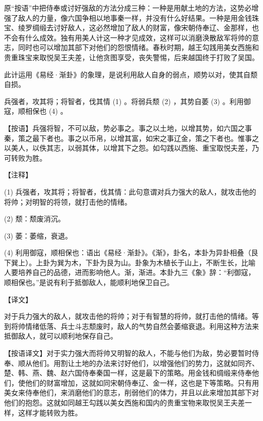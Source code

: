 \documentclass[12pt,UTF8]{ctexbook}
\begin{document}
原“按语”中把侍奉或讨好强敌的方法分成三种：一种是用献土地的方法，这势必增强了敌人的力量，像六国争相以地事秦一样，并没有什么好结果。一种是用金钱珠宝、绫罗绸缎去讨好敌人，这必然增加了敌人的财富，像宋朝侍奉辽、金那样，也不会有什么成效。独有用美人计这一种才见成效，这样可以消磨涣散敌军将帅的意志，同时也可以增加其部下对他们的怨恨情绪。春秋时期，越王勾践用美女西施和贵重珠宝来取悦吴王夫差，让他贪图享受，丧失警惕，后来越国终于打败了吴国。

此计运用《易经·渐卦》的象理，是说利用敌人自身的弱点，顺势以对，使其自颓自损。





兵强者，攻其将；将智者，伐其情 (1) 。将弱兵颓 (2) ，其势自萎 (3) 。利用御寇，顺相保也 (4) 。

【按语】兵强将智，不可以敌，势必事之。事之以土地，以增其势，如六国之事秦，策之最下者也。事之以币帛，以增其富，如宋之事辽金，策之下者也。惟事之以美人，以佚其志，以弱其体，以增其下之怨。如勾践以西施、重宝取悦夫差，乃可转败为胜。





【注释】


(1) 兵强者，攻其将；将智者，伐其情：此句意谓对兵力强大的敌人，就攻击他的将帅；对明智的将领，就打击他的情绪。

(2) 颓：颓废消沉。

(3) 萎：萎缩，衰退。

(4) 利用御寇，顺相保也：语出《易经·渐卦》。《渐》，卦名，本卦为异卦相叠（艮下巽上）。上卦为巽为木，下卦为艮为山。卦象为木植长于山上，不断生长，比喻人要培养自己的品德，进而影响他人。渐，渐进。本卦九三《象》辞：“利御寇，顺相保也。”是说有利于抵御敌人，能顺利地保卫自己。





【译文】


对于兵力强大的敌人，就攻击他的将帅；对于有智慧的将帅，就打击他的情绪。等到将帅情绪低落、兵士斗志颓废时，敌人的气势自然会萎缩衰退。利用这种方法来抵御敌人，就可以顺利地保存自己。

【按语译文】对于实力强大而将帅又明智的敌人，不能与他们为敌，势必要暂时侍奉、顺从他们。用割让土地的办法来讨好他们，以增强他们的势力，这就如同齐、楚、韩、燕、魏、赵六国侍奉秦国一样，这是最下的策略。用金钱和绸缎来侍奉他们，使他们的财富增加，这就如同宋朝侍奉辽、金一样，这也是下等策略。只有用美女来侍奉他们，来消磨他们的意志，削弱他们的体力，并且以此来增加其部下对他们的抱怨。这就如同越王勾践以美女西施和国内的贵重宝物来取悦吴王夫差一样，这样才能转败为胜。
\end{document}
